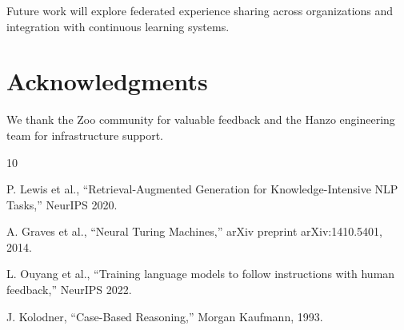 \documentclass[11pt,letterpaper]{article}
\begin{document}
Future work will explore federated experience sharing across organizations and integration with continuous learning systems.

\section*{Acknowledgments}

We thank the Zoo community for valuable feedback and the Hanzo engineering team for infrastructure support.


\begin{thebibliography}{10}

P. Lewis et al., ``Retrieval-Augmented Generation for Knowledge-Intensive NLP Tasks,'' NeurIPS 2020.

A. Graves et al., ``Neural Turing Machines,'' arXiv preprint arXiv:1410.5401, 2014.

L. Ouyang et al., ``Training language models to follow instructions with human feedback,'' NeurIPS 2022.

J. Kolodner, ``Case-Based Reasoning,'' Morgan Kaufmann, 1993.

\end{thebibliography}
\end{document}
